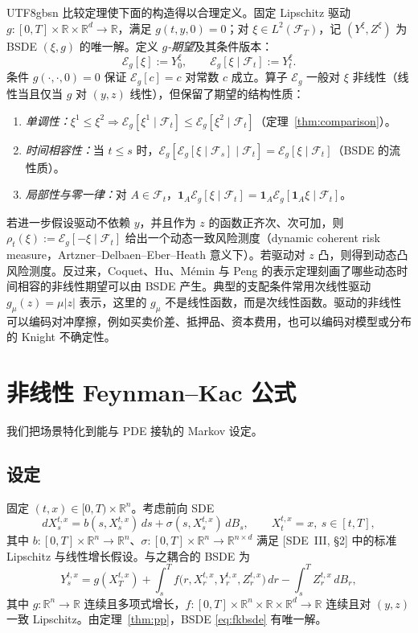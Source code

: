 \documentclass{article}
\theoremstyle{plain}
\theoremstyle{definition}
\theoremstyle{remark}
\newcommand{\R}{\mathbb{R}}
\newcommand{\F}{\mathcal{F}}
\begin{document}
\begin{CJK*}{UTF8}{gbsn}
比较定理使下面的构造得以合理定义。固定 Lipschitz 驱动 $g : [0,T] \times \R \times \R^d \to \R$，满足 $g(t, y, 0) = 0$；对 $\xi \in L^2(\F_T)$，记 $(Y^\xi, Z^\xi)$ 为 BSDE $(\xi, g)$ 的唯一解。定义 \emph{$g$-期望}及其条件版本：
\[
  \mathcal{E}_g[\xi] := Y^\xi_0, \qquad \mathcal{E}_g[\xi \mid \F_t] := Y^\xi_t.
\]
条件 $g(\cdot, \cdot, 0) = 0$ 保证 $\mathcal{E}_g[c] = c$ 对常数 $c$ 成立。算子 $\mathcal{E}_g$ 一般对 $\xi$ 非线性（线性当且仅当 $g$ 对 $(y, z)$ 线性），但保留了期望的结构性质：
\begin{enumerate}
  \item[(M)] \emph{单调性：}$\xi^1 \le \xi^2 \Rightarrow \mathcal{E}_g[\xi^1 \mid \F_t] \le \mathcal{E}_g[\xi^2 \mid \F_t]$（定理~\ref{thm:comparison}）。
  \item[(T)] \emph{时间相容性：}当 $t \le s$ 时，$\mathcal{E}_g[\mathcal{E}_g[\xi \mid \F_s] \mid \F_t] = \mathcal{E}_g[\xi \mid \F_t]$（BSDE 的流性质）。
  \item[(L)] \emph{局部性与零一律：}对 $A \in \F_t$，$\mathbf{1}_A \mathcal{E}_g[\xi \mid \F_t] = \mathbf{1}_A \mathcal{E}_g[\mathbf{1}_A \xi \mid \F_t]$。
\end{enumerate}
若进一步假设驱动不依赖 $y$，并且作为 $z$ 的函数正齐次、次可加，则 $\rho_t(\xi) := \mathcal{E}_g[-\xi \mid \F_t]$ 给出一个动态一致风险测度（dynamic coherent risk measure，Artzner--Delbaen--Eber--Heath 意义下）。若驱动对 $z$ 凸，则得到动态凸风险测度。反过来，Coquet、Hu、M\'emin 与 Peng 的表示定理刻画了哪些动态时间相容的非线性期望可以由 BSDE 产生。典型的支配条件常用次线性驱动 $g_\mu(z) = \mu|z|$ 表示，这里的 $g_\mu$ 不是线性函数，而是次线性函数。驱动的非线性可以编码对冲摩擦，例如买卖价差、抵押品、资本费用，也可以编码对模型或分布的 Knight 不确定性。

\section{非线性 Feynman--Kac 公式}

我们把场景特化到能与 PDE 接轨的 Markov 设定。

\subsection{设定}

固定 $(t, x) \in [0, T) \times \R^n$。考虑前向 SDE
\begin{equation}\label{eq:fwd}
  dX^{t,x}_s = b(s, X^{t,x}_s)\,ds + \sigma(s, X^{t,x}_s)\, dB_s, \qquad X^{t,x}_t = x,\ s \in [t, T],
\end{equation}
其中 $b : [0, T] \times \R^n \to \R^n$、$\sigma : [0, T] \times \R^n \to \R^{n \times d}$ 满足 [SDE~III, \S2] 中的标准 Lipschitz 与线性增长假设。与之耦合的 BSDE 为
\begin{equation}\label{eq:fkbsde}
  Y^{t,x}_s = g(X^{t,x}_T) + \int_s^T f\!\big(r, X^{t,x}_r, Y^{t,x}_r, Z^{t,x}_r\big)\,dr - \int_s^T Z^{t,x}_r\, dB_r,
\end{equation}
其中 $g : \R^n \to \R$ 连续且多项式增长，$f : [0, T] \times \R^n \times \R \times \R^d \to \R$ 连续且对 $(y, z)$ 一致 Lipschitz。由定理~\ref{thm:pp}，BSDE \eqref{eq:fkbsde} 有唯一解。


\end{CJK*}
\end{document}
